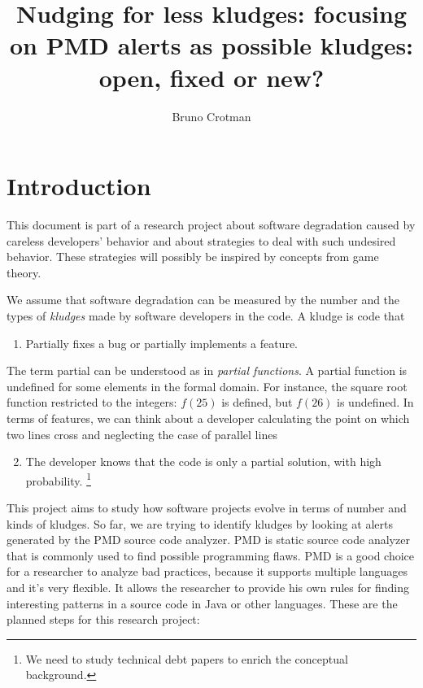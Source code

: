 \documentclass[
]{article}
\title{Nudging for less kludges: focusing on PMD alerts as possible kludges:
open, fixed or new?}
\author{Bruno Crotman}
\date{}
\providecommand{\tightlist}{%
  \setlength{\itemsep}{0pt}\setlength{\parskip}{0pt}}
\begin{document}
\maketitle

{
\setcounter{tocdepth}{3}
\tableofcontents
}
\small

\normalsize

\section{Introduction}\label{intro}

This document is part of a research project about software degradation
caused by careless developers' behavior and about strategies to deal
with such undesired behavior. These strategies will possibly be inspired
by concepts from game theory.

We assume that software degradation can be measured by the number and
the types of \textit{kludges} made by software developers in the code. A
kludge is code that

\begin{enumerate}
\def\labelenumi{\arabic{enumi}.}
\tightlist
\item
  Partially fixes a bug or partially implements a feature.
\end{enumerate}

\setlength{\parindent}{1.2cm}
\hangindent=1.2cm

The term partial can be understood as in \textit{partial functions}. A
partial function is undefined for some elements in the formal domain.
For instance, the square root function restricted to the integers:
\(f(25)\) is defined, but \(f(26)\) is undefined. In terms of features,
we can think about a developer calculating the point on which two lines
cross and neglecting the case of parallel lines

\begin{enumerate}
\setcounter{enumi}{1}
\tightlist
\item
  The developer knows that the code is only a partial solution, with
  high probability. \footnote{We need to study technical debt papers
  to enrich the conceptual background.}
\end{enumerate}

This project aims to study how software projects evolve in terms of
number and kinds of kludges. So far, we are trying to identify kludges
by looking at alerts generated by the PMD source code analyzer. PMD is
static source code analyzer that is commonly used to find possible
programming flaws. PMD is a good choice for a researcher to analyze bad
practices, because it supports multiple languages and it's very
flexible. It allows the researcher to provide his own rules for finding
interesting patterns in a source code in Java or other languages. These
are the planned steps for this research project:
\end{document}
